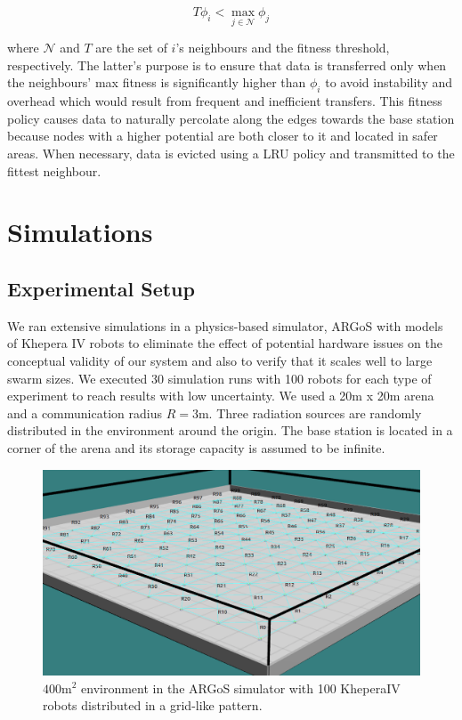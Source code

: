 \begin{equation}
    T\phi_i < \max_{j \in \mathcal{N}} \phi_j
\end{equation}

where $\mathcal{N}$ and $T$ are the set of $i$'s neighbours and the fitness threshold, 
respectively. The latter's purpose is to ensure that data is transferred only when the 
neighbours' max fitness is significantly higher than $\phi_i$ to avoid instability and 
overhead which would result from frequent and inefficient transfers. This fitness policy causes data to naturally percolate along the edges towards the base station because nodes 
with a higher potential are both closer to it and
located in safer areas. When necessary, data is evicted using a \ac{LRU} policy and transmitted to the fittest neighbour.


\section{Simulations}
\label{Simulations}

\subsection{Experimental Setup}
\label{rassSetup}

We ran extensive simulations in a physics-based simulator, ARGoS
\cite{Pinciroli:SI2012} with models of Khepera IV
\cite{kteam2021kheperaiv} robots to eliminate the effect of potential
hardware issues on the conceptual validity of our system and also to
verify that it scales well to large swarm sizes. We executed 30 simulation
runs with 100 robots for each type of experiment to reach results
with low uncertainty. We used a 20m x 20m arena and a communication radius $R=3$m. Three radiation sources are randomly distributed in the environment around the origin. The base station is located in a corner of the arena and its storage capacity is assumed to be infinite. 

\begin{figure}[htbp]
	\centering
    \includegraphics[width=\columnwidth]{figures/dora_mesh/argos_grid_link.png}
    \caption[Grid formation in ARGoS]{$400 \text{m}^2$ environment in the ARGoS simulator with 100 KheperaIV robots distributed in a grid-like pattern.}
    \label{argos:grid}
\end{figure}

